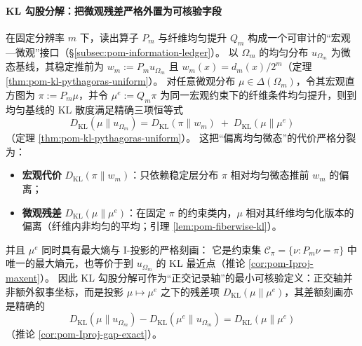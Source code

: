 \paragraph{KL 勾股分解：把微观残差严格外置为可核验字段}
在固定分辨率 \(m\) 下，读出算子 \(P_m\) 与纤维均匀提升 \(Q_m\) 构成一个可审计的“宏观—微观”接口（\S\ref{subsec:pom-information-ledger}）。
以 \(\Omega_m\) 的均匀分布 \(u_{\Omega_m}\) 为微态基线，其稳定推前为
\(
w_m:=P_m u_{\Omega_m}
\)
且 \(w_m(x)=d_m(x)/2^m\)（定理 \ref{thm:pom-kl-pythagoras-uniform}）。
对任意微观分布 \(\mu\in\Delta(\Omega_m)\)，令其宏观直方图为 \(\pi:=P_m\mu\)，并令 \(\mu^e:=Q_m\pi\) 为同一宏观约束下的纤维条件均匀提升，则到均匀基线的 KL 散度满足精确三项恒等式
\[
\boxed{\;
D_{\mathrm{KL}}(\mu\|u_{\Omega_m})
=D_{\mathrm{KL}}(\pi\|w_m)\;+\;D_{\mathrm{KL}}(\mu\|\mu^e)\;}
\]
（定理 \ref{thm:pom-kl-pythagoras-uniform}）。
这把“偏离均匀微态”的代价严格分裂为：
\begin{itemize}
  \item \textbf{宏观代价} \(D_{\mathrm{KL}}(\pi\|w_m)\)：只依赖稳定层分布 \(\pi\) 相对均匀微态推前 \(w_m\) 的偏离；
  \item \textbf{微观残差} \(D_{\mathrm{KL}}(\mu\|\mu^e)\)：在固定 \(\pi\) 的约束类内，\(\mu\) 相对其纤维均匀化版本的偏离（纤维内非均匀的平均；引理 \ref{lem:pom-fiberwise-kl}）。
\end{itemize}
并且 \(\mu^e\) 同时具有最大熵与 I-投影的严格刻画：
它是约束集 \(\mathcal{C}_\pi=\{\nu:P_m\nu=\pi\}\) 中唯一的最大熵元，也等价于到 \(u_{\Omega_m}\) 的 KL 最近点（推论 \ref{cor:pom-Iproj-maxent}）。
因此 KL 勾股分解可作为“正交记录轴”的最小可核验定义：正交轴并非额外叙事坐标，而是投影 \(\mu\mapsto\mu^e\) 之下的残差项 \(D_{\mathrm{KL}}(\mu\|\mu^e)\)，其差额刻画亦是精确的
\[
D_{\mathrm{KL}}(\mu\|u_{\Omega_m})-D_{\mathrm{KL}}(\mu^e\|u_{\Omega_m})
=D_{\mathrm{KL}}(\mu\|\mu^e)
\]
（推论 \ref{cor:pom-Iproj-gap-exact}）。

